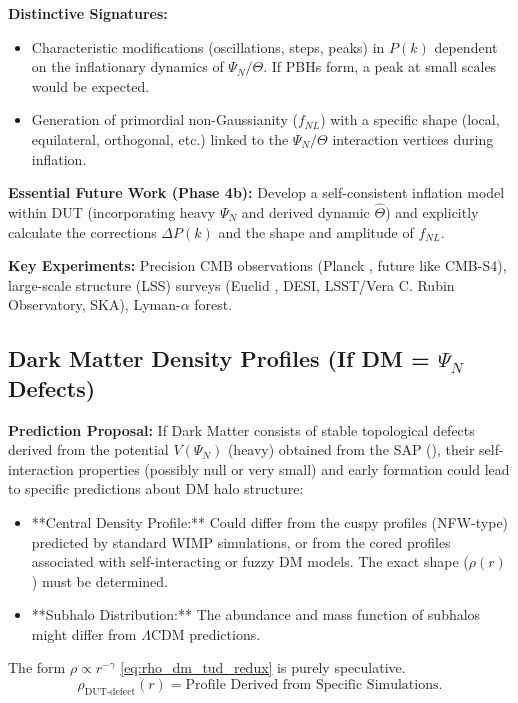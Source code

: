 \documentclass[11pt, a4paper]{article}
\theoremstyle{remark}
\newcommand{\Op}[1]{\hat{#1}}
\begin{document}
\textbf{Distinctive Signatures:}
\begin{itemize}
    \item Characteristic modifications (oscillations, steps, peaks) in \(P(k)\) dependent on the inflationary dynamics of \( \Psi_N/\Theta \). If PBHs form, a peak at small scales would be expected.
    \item Generation of primordial non-Gaussianity (\( f_{NL} \)) with a specific shape (local, equilateral, orthogonal, etc.) linked to the \( \Psi_N/\Theta \) interaction vertices during inflation.
\end{itemize}

\textbf{Essential Future Work (Phase 4b):}
Develop a self-consistent inflation model within DUT (incorporating heavy \( \Psi_N \) and derived dynamic \( \Op{\Theta} \)) and explicitly calculate the corrections \( \Delta P(k) \) and the shape and amplitude of \( f_{NL} \).

\textbf{Key Experiments:}
Precision CMB observations (Planck \citep{Planck2018Inflation, Planck2018NonGaussianity}, future like CMB-S4), large-scale structure (LSS) surveys (Euclid \citep{EuclidCollaboration}, DESI, LSST/Vera C. Rubin Observatory, SKA), Lyman-\(\alpha\) forest.

\subsection{Dark Matter Density Profiles (If DM = \texorpdfstring{$\Psi_N$}{PsiN} Defects)}
\label{subsec:dm_profile_final_revised}

\textbf{Prediction Proposal:}
If Dark Matter consists of stable topological defects derived from the potential \( V(\Psi_N) \) (heavy) obtained from the SAP (), their self-interaction properties (possibly null or very small) and early formation could lead to specific predictions about DM halo structure:
\begin{itemize}
    \item **Central Density Profile:** Could differ from the cuspy profiles (NFW-type) predicted by standard WIMP simulations, or from the cored profiles associated with self-interacting or fuzzy DM models. The exact shape (\( \rho(r) \)) must be determined.
    \item **Subhalo Distribution:** The abundance and mass function of subhalos might differ from \(\Lambda\)CDM predictions.
\end{itemize}
The form \( \rho \propto r^{-\gamma} \) \eqref{eq:rho_dm_tud_redux} is purely speculative.
\begin{equation} \label{eq:rho_dm_tud_redux}
\rho_{\text{DUT-defect}}(r) = \text{Profile Derived from Specific Simulations}.
\end{equation}
\end{document}
